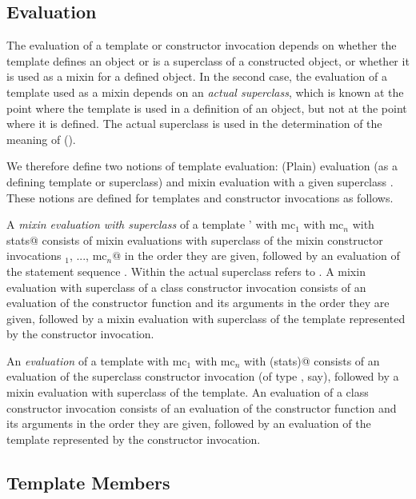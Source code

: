 \documentclass[11pt]{report}
\begin{document}
\subsection{Evaluation}

The evaluation of a template or constructor invocation depends on
whether the template defines an object or is a superclass of a
constructed object, or whether it is used as a mixin for a defined
object.  In the second case, the evaluation of a template used as a
mixin depends on an {\em actual superclass}, which is known at the
point where the template is used in a definition of an object, but not
at the point where it is defined. The actual superclass is used in the
determination of the meaning of \verb@super@ ().

We therefore define two notions of template evaluation: (Plain)
evaluation (as a defining template or superclass) and mixin evaluation
with a given superclass \verb@sc@. These notions are defined for templates
and constructor invocations as follows.

A {\em mixin evaluation with superclass \verb@sc@} of a template
\verb@sc' with mc$_1$ with mc$_n$ with {stats}@ consists of mixin
evaluations with superclass \verb@sc@ of the mixin constructor invocations
\verb@mc$_1$, ..., mc$_n$@ in the order they are given, followed by an
evaluation of the statement sequence \verb@stats@.  Within \verb@stats@ the
actual superclass refers to \verb@sc@.  A mixin evaluation with superclass
\verb@sc@ of a class constructor invocation \verb@ci@ consists of an evaluation
of the constructor function and its arguments in the order they are
given, followed by a mixin evaluation with superclass \verb@sc@ of the
template represented by the constructor invocation.

An {\em evaluation} of a template
\verb@sc with mc$_1$ with mc$_n$ with (stats)@ consists of an evaluation of
the superclass constructor invocation \verb@sc@ (of type \verb@S@, say),
followed by a mixin evaluation with superclass \verb@sc@ of the template. An
evaluation of a class constructor invocation \verb@ci@ consists of an
evaluation of the constructor function and its arguments in
the order they are given, followed by an evaluation of the template
represented by the constructor invocation.

\subsection{Template Members}
\end{document}

